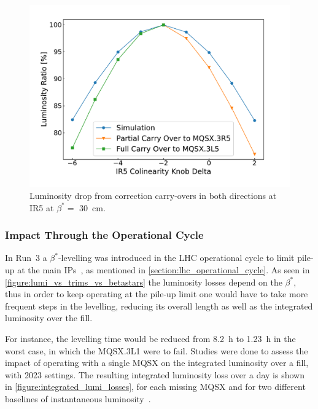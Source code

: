 \begin{figure}[!htb]
    \centering
    \includegraphics*[width=\textwidth]{Figures/IR_Coupling_Correction/ir5_scans_vs_simu.pdf}
    \caption{Luminosity drop from correction carry-overs in both directions at IR\num{5} at \(\beta^{\ast} =\) \qty{30}{\centi\meter}.}
    \label{figure:ir5_carry_over_vs_simulations}
\end{figure}


\subsubsection*{Impact Through the Operational Cycle}

In Run~\num{3} a \(\beta^{\ast}\)-levelling was introduced in the LHC operational cycle to limit pile-up at the main IPs~\cite{MEETING:Fartoukh:Run3_Configuration}, as mentioned in \cref{section:lhc_operational_cycle}.
As seen in \cref{figure:lumi_vs_trims_vs_betastars} the luminosity losses depend on the \(\beta^{\ast}\), thus in order to keep operating at the pile-up limit one would have to take more frequent steps in the levelling, reducing its overall length as well as the integrated luminosity over the fill.

For instance, the levelling time would be reduced from \qty{8.2}{\hour} to \qty{1.23}{\hour} in the worst case, in which the MQSX.\num{3}L\num{1} were to fail.
Studies were done to assess the impact of operating with a single MQSX on the integrated luminosity over a fill, with \num{2023} settings.
The resulting integrated luminosity loss over a day is shown in \cref{figure:integrated_lumi_losses}, for each missing MQSX and for two different baselines of instantaneous luminosity~\cite{MEETING:Kostoglou:Integrated_Lumi_MQSX_Carryovers}.

